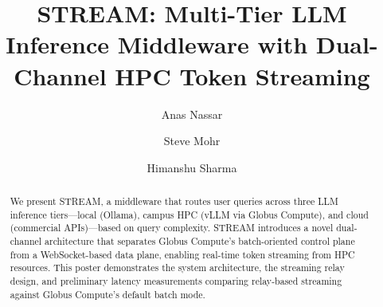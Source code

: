 \documentclass[manuscript, review]{acmart}
\begin{document}

\title{STREAM: Multi-Tier LLM Inference Middleware with Dual-Channel HPC Token Streaming}

\author{Anas Nassar}

\author{Steve Mohr}

\author{Himanshu Sharma}


\begin{abstract}
We present STREAM, a middleware that routes user queries across three LLM inference tiers---local (Ollama), campus HPC (vLLM via Globus Compute), and cloud (commercial APIs)---based on query complexity. STREAM introduces a novel dual-channel architecture that separates Globus Compute's batch-oriented control plane from a WebSocket-based data plane, enabling real-time token streaming from HPC resources. This poster demonstrates the system architecture, the streaming relay design, and preliminary latency measurements comparing relay-based streaming against Globus Compute's default batch mode.
\end{abstract}


\maketitle

\end{document}
